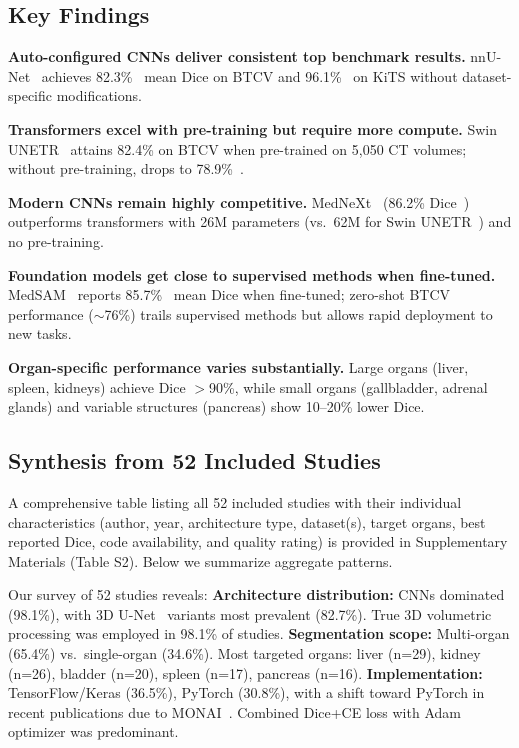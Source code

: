 \documentclass[conference]{IEEEtran}
\begin{document}
\subsection{Key Findings}

\textbf{Auto-configured CNNs deliver consistent top benchmark results.} nnU-Net~\cite{isensee2021nnunet} achieves 82.3\%~\cite{isensee2021nnunet} mean Dice on BTCV and 96.1\%~\cite{isensee2021nnunet} on KiTS without dataset-specific modifications.

\textbf{Transformers excel with pre-training but require more compute.} Swin UNETR~\cite{swinunetr2022} attains 82.4\% on BTCV when pre-trained on 5,050 CT volumes; without pre-training, drops to 78.9\%~\cite{swinunetr2022}.

\textbf{Modern CNNs remain highly competitive.} MedNeXt~\cite{roy2023mednext} (86.2\% Dice~\cite{roy2023mednext}) outperforms transformers with 26M parameters (vs.\ 62M for Swin UNETR~\cite{swinunetr2022}) and no pre-training.

\textbf{Foundation models get close to supervised methods when fine-tuned.} MedSAM~\cite{ma2024medsam} reports 85.7\%~\cite{ma2024medsam} mean Dice when fine-tuned; zero-shot BTCV performance ($\sim$76\%) trails supervised methods but allows rapid deployment to new tasks.

\textbf{Organ-specific performance varies substantially.} Large organs (liver, spleen, kidneys) achieve Dice $>$90\%, while small organs (gallbladder, adrenal glands) and variable structures (pancreas) show 10--20\% lower Dice.

\subsection{Synthesis from 52 Included Studies}

A comprehensive table listing all 52 included studies with their individual characteristics (author, year, architecture type, dataset(s), target organs, best reported Dice, code availability, and quality rating) is provided in Supplementary Materials (Table S2). Below we summarize aggregate patterns.

Our survey of 52 studies reveals: \textbf{Architecture distribution:} CNNs dominated (98.1\%), with 3D U-Net~\cite{cicek20163dunet} variants most prevalent (82.7\%). True 3D volumetric processing was employed in 98.1\% of studies. \textbf{Segmentation scope:} Multi-organ (65.4\%) vs.\ single-organ (34.6\%). Most targeted organs: liver (n=29), kidney (n=26), bladder (n=20), spleen (n=17), pancreas (n=16). \textbf{Implementation:} TensorFlow/Keras (36.5\%), PyTorch (30.8\%), with a shift toward PyTorch in recent publications due to MONAI~\cite{monai2022}. Combined Dice+CE loss with Adam optimizer was predominant.
\end{document}
